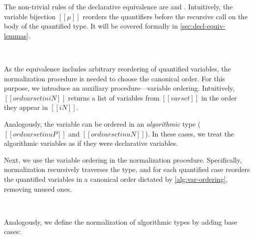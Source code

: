\documentclass[acmsmall,natbib=false,review,anonymous]{acmart}
\begin{document}
The non-trivial rules of the declarative equivalence are
 and .
Intuitively, the variable bijection $[[μ]]$ reorders the quantifiers before
the recursive call on the body of the quantified type. 
It will be covered formally in \cref{sec:decl-equiv-lemmas}.

\begin{definition}
  \hfill
  
  \begin{multicols}{2}
  \ottdefnEOneNeqLabeled{}
  \columnbreak\\
  \ottdefnEOnePeqLabeled{}
  \end{multicols}

\end{definition}

As the equivalence includes arbitrary reordering of quantified variables,
the normalization procedure is needed to choose the canonical order.
For this purpose, we introduce an auxiliary procedure---variable ordering. 
Intuitively, $[[ord varset in iN]]$ returns a list of variables from $[[varset]]$
in the order they appear in $[[iN]]$.

\begin{algorithm}
  \label{alg:var-ordering}
  \hfill
  
  \ottdefnONVarLabeled{}
  \ottdefnOPVarLabeled{}

  Analogously, the variable can be ordered in 
  an \emph{algorithmic} type ($[[ord varset in uP]]$ and 
  $[[ord varset in uN]]$). In these cases, we treat the algorithmic variables
  as if they were declarative variables.

\end{algorithm}

Next, we use the variable ordering in the normalization procedure. 
Specifically, normalization recursively traverses the type, 
and for each quantified case reorders the quantified variables in a 
canonical order dictated by \cref{alg:var-ordering}, removing unused ones.

\begin{algorithm}
  \label{alg:type-nf}
  \hfill
  
  \begin{multicols}{2}
  \ottdefnNrmNNormLabeled{}
  \columnbreak\\
  \ottdefnNrmPNormLabeled{}
  \end{multicols}

  Analogously, we define the normalization of algorithmic types by adding base cases:

  \begin{multicols}{2}
  \ottdefnNrmuNNormLabeled{}
  \columnbreak\\
  \ottdefnNrmuPNormLabeled{}
  \end{multicols}

\end{algorithm}
\end{document}
